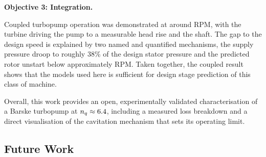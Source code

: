 \textbf{Objective 3: Integration.} 

Coupled turbopump operation was demonstrated at around \valCoupledRpm{} RPM, with the turbine driving the pump to a measurable head rise and the shaft. The gap to the design speed is explained by two named and quantified mechanisms, the supply pressure droop to roughly 38\% of the design stator pressure and the predicted rotor unstart below approximately \valTurbStartRpm{} RPM. Taken together, the coupled result shows that the models used here is sufficient for design stage prediction of this class of machine. 


Overall, this work provides an open, experimentally validated characterisation of a Barske turbopump at $n_q \approx \num{6.4}$, including a measured loss breakdown and a direct visualisation of the cavitation mechanism that sets its operating limit.


\subsection{Future Work}


